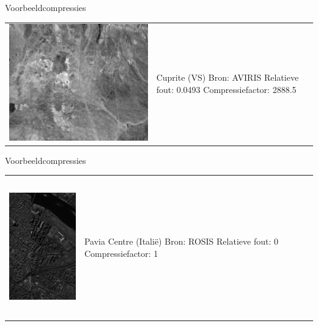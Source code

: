 \documentclass[t,12pt,dutch
\ifx\beamermode\undefined\else,\beamermode\fi
]{beamer}
\begin{document}
\begin{frame}{Voorbeeldcompressies}

\begin{table}[H]
\centering
\begin{tabular}{C{0.6\textwidth}  L{0.4\textwidth}}
\includegraphics[width=\linewidth]{images/example_compression_Cuprite_0_05.png}
&
Cuprite (VS)\newline
Bron: AVIRIS \cite{ref:ehu_aviris_cuprite}\newline
\vspace{5mm}
Relatieve fout: 0.0493
Compressiefactor: 2888.5
\end{tabular}
\end{table}

\end{frame}

\begin{frame}{Voorbeeldcompressies}

\begin{table}[H]
\centering
\begin{tabular}{C{0.6\textwidth}  L{0.4\textwidth}}
\includegraphics[height=6cm]{images/pavia_sum.png}
&
Pavia Centre (Itali\"e)\newline
Bron: ROSIS \cite{ref:ehu_rosis_pavia_centre}\newline
\vspace{5mm}
Relatieve fout: 0
Compressiefactor: 1
\end{tabular}
\end{table}

\end{frame}
\end{document}
